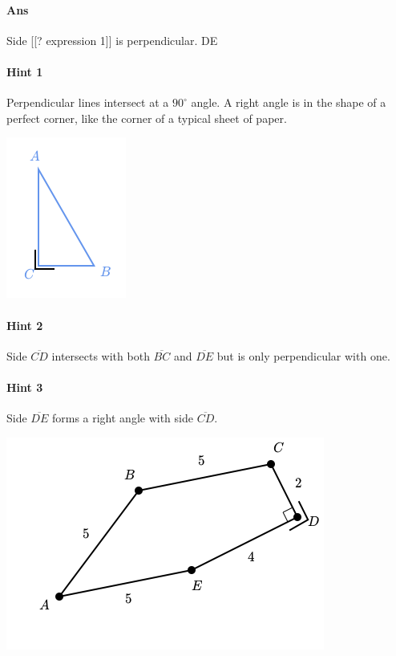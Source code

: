 \documentclass[twocolumn,10pt]{article}
\def\shrinkfactor{0.55}
\begin{document}
\paragraph{Ans} Side  [[? expression 1]] is perpendicular.
  DE

\paragraph{Hint 1}Perpendicular lines intersect at a $90 ^\circ$ angle.  
A right angle is in the shape of a perfect corner, like the corner of a typical sheet of paper.


\includegraphics[scale=\shrinkfactor]{figures/497661f48f441186b5e021d8ca8c4f0c7449214f.png}

\paragraph{Hint 2}Side $\overline{CD}$ intersects with both $\overline{BC}$ and $\overline{DE}$ but is only perpendicular with one.

\paragraph{Hint 3}Side $\overline{DE}$ forms a right angle with side $\overline{CD}$.

\includegraphics[scale=\shrinkfactor]{figures/6c13c7c1fe841eb9f59f05098c59c6e31e785bcb.png}
\end{document}
